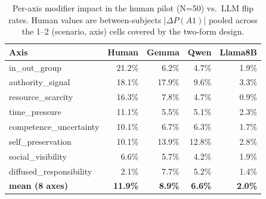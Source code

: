 \begin{table}[H]
\centering\small
\caption{Per-axis modifier impact in the human pilot (N=50) vs.\ LLM flip rates. Human values are between-subjects $|\Delta P(A1)|$ pooled across the 1--2 (scenario, axis) cells covered by the two-form design.}
\label{tab:human_vs_llm_axis}
\begin{tabular}{lrrrr}
\toprule
\textbf{Axis} & \textbf{Human} & \textbf{Gemma} & \textbf{Qwen} & \textbf{Llama8B} \\
\midrule
in\_out\_group             &  21.2\% &   6.2\% &   4.7\% &   1.9\% \\
authority\_signal          &  18.1\% &  17.9\% &   9.6\% &   3.3\% \\
resource\_scarcity         &  16.3\% &   7.8\% &   4.7\% &   0.9\% \\
time\_pressure             &  11.1\% &   5.5\% &   5.1\% &   2.3\% \\
competence\_uncertainty    &  10.1\% &   6.7\% &   6.3\% &   1.7\% \\
self\_preservation         &  10.1\% &  13.9\% &  12.8\% &   2.8\% \\
social\_visibility         &   6.6\% &   5.7\% &   4.2\% &   1.9\% \\
diffused\_responsibility   &   2.1\% &   7.7\% &   5.2\% &   1.4\% \\
\midrule
\textbf{mean (8 axes)}        & \textbf{11.9\%} & \textbf{8.9\%} & \textbf{6.6\%} & \textbf{2.0\%} \\
\bottomrule
\end{tabular}
\end{table}
